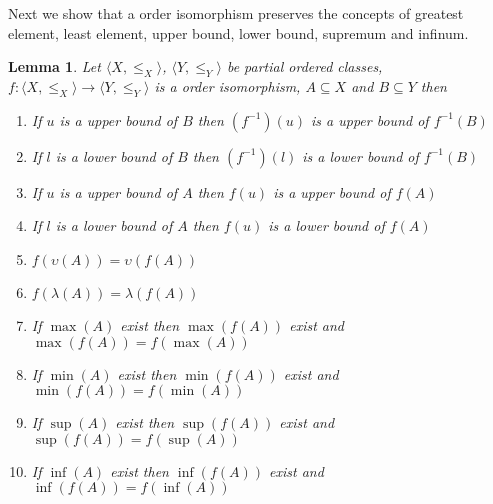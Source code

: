 \documentclass{book}
\newtheorem{lemma}{Lemma}
\begin{document}
Next we show that a order isomorphism preserves the concepts of greatest
element, least element, upper bound, lower bound, supremum and infinum.

\begin{lemma}
  \label{order isomorphism preservers sup and inf}Let $\langle X, \leqslant_X
  \rangle$, $\langle Y, \leqslant_Y \rangle$ be partial ordered classes, $f :
  \langle X, \leqslant_X \rangle \rightarrow \langle Y, \leqslant_Y \rangle$
  is a order isomorphism, $A \subseteq X$ and $B \subseteq Y$ then
  \begin{enumerate}
    \item If $u$ is a upper bound of $B$ then $(f^{- 1}) (u)$ is a upper bound
    of $f^{- 1} (B)$
    
    \item If $l$ is a lower bound of $B$ then $(f^{- 1}) (l)$ is a lower bound
    of $f^{- 1} (B)$
    
    \item If $u$ is a upper bound of $A$ then $f (u)$ is a upper bound of $f
    (A)$
    
    \item If $l$ is a lower bound of $A$ then $f (u)$ is a lower bound of $f
    (A)$
    
    \item $f (\upsilon (A)) = \upsilon (f (A))$
    
    \item $f (\lambda (A)) = \lambda (f (A))$
    
    \item If $\max (A)$ exist then $\max (f (A))$ exist and $\max (f (A)) = f
    (\max (A))$
    
    \item If $\min (A)$ exist then $\min (f (A))$ exist and $\min (f (A)) = f
    (\min (A))$
    
    \item If $\sup (A)$ exist then $\sup (f (A))$ exist and $\sup (f (A)) = f
    (\sup (A))$
    
    \item If $\inf (A)$ exist then $\inf (f (A))$ exist and $\inf (f (A)) = f
    (\inf (A))$
  \end{enumerate}
\end{lemma}
\end{document}
